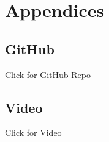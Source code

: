 \chapter{Appendices}
\section{GitHub}
\href{https://github.com/seanmoylan/Applied_Project}
{Click for GitHub Repo}

\section{Video}
\href{https://github.com/seanmoylan/Applied_Project/blob/master/Screencast/app_screencast.mp4}
{Click for Video}
